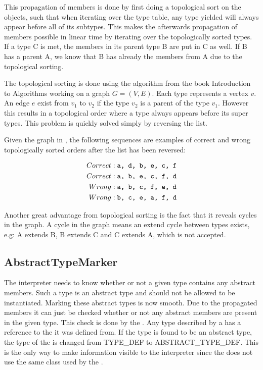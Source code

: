 This propagation of members is done by first doing a topological sort on the
 objects, such that when iterating over the type table,
any type yielded will always appear before all of its subtypes. This makes the
afterwards propagation of members possible in linear time by iterating over the
topologically sorted types. If a type C is met, the members in its parent type B
are put in C as well. If B has a parent A, we know that B has already the
members from A due to the topological sorting.

The topological sorting is done using the algorithm from the book Introduction
to Algorithms \cite[p. 612]{ad} working on a graph $G = (V, E)$. Each type
represents a vertex $v$. An edge $e$ exist from $v_1$ to $v_2$ if the type $v_2$
is a parent of the type $v_1$. However this results in a topological order where
a type always appears before its super types. This problem is quickly solved
simply by reversing the list.

Given the graph in , the following sequences are examples
of correct and wrong topologically sorted orders after the list has been reversed:

\begin{align*}
 Correct &: \texttt{a, d, b, e, c, f} \\
 Correct &: \texttt{a, b, e, c, f, d} \\
 Wrong &: \texttt{a, b, c, \textbf{f}, \textbf{e}, d} \\
 Wrong &: \texttt{\textbf{b}, c, e, \textbf{a}, f, d}
\end{align*}



Another great advantage from topological sorting is the fact that it reveals
cycles in the graph. A cycle in the graph means an extend cycle between types
exists, e.g: A extends B, B extends C and C extends A, which is not accepted.

\subsection{AbstractTypeMarker}
\label{sec:abstractTypeMarker}
The interpreter needs to know whether or not a given type contains any abstract
members. Such a type is an abstract type and should not be allowed to be
instantiated. Marking these abstract types is now smooth. Due to the propagated
members it can just be checked whether or not any abstract members are present in the
given type. This check is done by the . Any type
described by a  has a reference to the
 it was defined from. If the type is found to be an abstract
type, the type of the  is changed from TYPE\_DEF to
ABSTRACT\_TYPE\_DEF. This is the only way to make information visible to the
interpreter since the  does not use the same
 class used by the .

